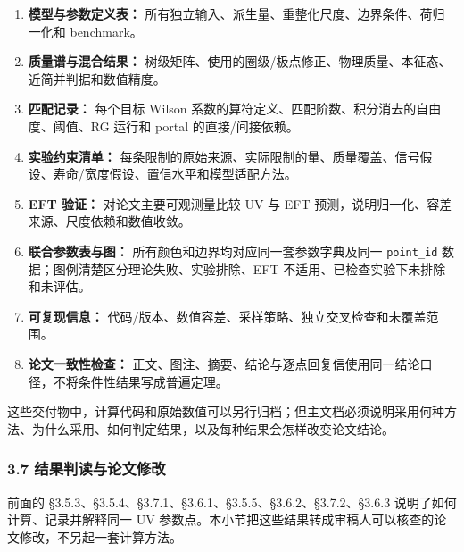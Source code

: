 \documentclass[
]{article}
\providecommand{\tightlist}{%
  \setlength{\itemsep}{0pt}\setlength{\parskip}{0pt}}
\begin{document}
\begin{enumerate}
\def\labelenumi{\arabic{enumi}.}
\tightlist
\item
  \textbf{模型与参数定义表：}
  所有独立输入、派生量、重整化尺度、边界条件、荷归一化和 benchmark。
\item
  \textbf{质量谱与混合结果：}
  树级矩阵、使用的圈级/极点修正、物理质量、本征态、近简并判据和数值精度。
\item
  \textbf{匹配记录：} 每个目标 Wilson
  系数的算符定义、匹配阶数、积分消去的自由度、阈值、RG 运行和 portal
  的直接/间接依赖。
\item
  \textbf{实验约束清单：}
  每条限制的原始来源、实际限制的量、质量覆盖、信号假设、寿命/宽度假设、置信水平和模型适配方法。
\item
  \textbf{EFT 验证：} 对论文主要可观测量比较 UV 与 EFT
  预测，说明归一化、容差来源、尺度依赖和数值收敛。
\item
  \textbf{联合参数表与图：} 所有颜色和边界均对应同一套参数字典及同一
  \texttt{point\_id} 数据；图例清楚区分理论失败、实验排除、EFT
  不适用、已检查实验下未排除和未评估。
\item
  \textbf{可复现信息：}
  代码/版本、数值容差、采样策略、独立交叉检查和未覆盖范围。
\item
  \textbf{论文一致性检查：}
  正文、图注、摘要、结论与逐点回复信使用同一结论口径，不将条件性结果写成普遍定理。
\end{enumerate}

这些交付物中，计算代码和原始数值可以另行归档；但主文档必须说明采用何种方法、为什么采用、如何判定结果，以及每种结果会怎样改变论文结论。

\subsubsection{3.7
结果判读与论文修改}\label{ux7ed3ux679cux5224ux8bfbux4e0eux8bbaux6587ux4feeux6539-1}

前面的 §3.5.3、§3.5.4、§3.7.1、§3.6.1、§3.5.5、§3.6.2、§3.7.2、§3.6.3
说明了如何计算、记录并解释同一 UV
参数点。本小节把这些结果转成审稿人可以核查的论文修改，不另起一套计算方法。
\end{document}
